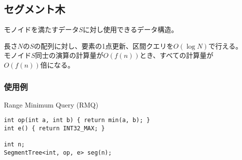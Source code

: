 \subsection{セグメント木}

モノイドを満たすデータ$S$に対し使用できるデータ構造。

長さ$N$の$S$の配列に対し、要素の1点更新、区間クエリを$O(\log N)$で行える。
モノイド$S$同士の演算の計算量が$O(f(n))$とき、すべての計算量が$O(f(n))$倍になる。



\subsubsection*{使用例}

Range Minimum Query (RMQ)

\begin{lstlisting}
int op(int a, int b) { return min(a, b); }
int e() { return INT32_MAX; }

int n;
SegmentTree<int, op, e> seg(n);
\end{lstlisting}